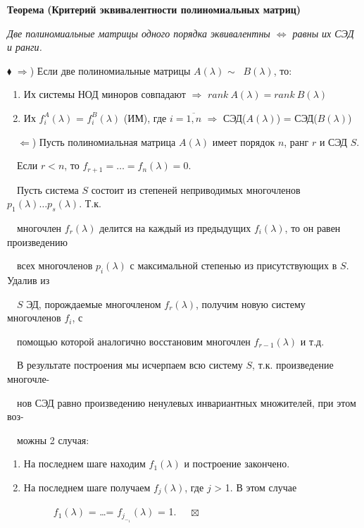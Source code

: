 \documentclass[a4paper, 12pt]{report}
\begin{document}
	\par\bigskip
	\textbf{Теорема}
	\textbf{(Критерий эквивалентности полиномиальных матриц)}
	
	\textit{Две полиномиальные матрицы одного порядка эквивалентны $\Longleftrightarrow$ равны их СЭД и ранги.}
	
	$\blacklozenge$ $\Rightarrow$) Если две полиномиальные матрицы $A(\lambda)$ $\sim$ \ $B(\lambda)$, то:
	
	\begin{enumerate}
		\setlength{\itemindent}{3em}
		\item Их системы НОД миноров совпадают $\Rightarrow$ $rank \ A(\lambda) = rank \ B(\lambda)$ 
		\item Их $f^A_i(\lambda)$ = $f^B_i(\lambda)$ (ИМ), где $i = \overline{1, n}$ $\Rightarrow$ СЭД($A(\lambda)$) = СЭД($B(\lambda)$)
	\end{enumerate}
	
	$\quad \Leftarrow$) Пусть полиномиальная матрица $A(\lambda)$ имеет порядок $n$, ранг $r$ и СЭД $S$.
	\par\bigskip
	$\quad$Если $r < n$, то $f_{r+1} = \dots = f_n(\lambda) = 0$.
	\par\bigskip
	$\quad$Пусть система $S$ состоит из степеней неприводимых многочленов $p_1(\lambda) \dots p_s(\lambda)$. Т.к. 
	
	$\quad$многочлен $f_r(\lambda)$ делится на каждый из предыдущих $f_i(\lambda)$, то он равен произведению
	
	$\quad$всех многочленов $p_i(\lambda)$ с максимальной степенью из присутствующих в $S$. Удалив из 
	
	$\quad$$S$ ЭД, порождаемые многочленом $f_r(\lambda)$, получим новую систему многочленов $f_i$, с 
	
	$\quad$помощью которой аналогично восстановим многочлен $f_{r-1}(\lambda)$ и т.д.
	\par\bigskip
	$\quad$В результате построения мы исчерпаем всю систему $S$, т.к. произведение многочле-
	
	$\quad$нов СЭД равно произведению ненулевых инвариантных множителей, при этом воз-
	
	$\quad$можны 2 случая: 
	\begin{enumerate}
		\setlength{\itemindent}{3em}
		\item На последнем шаге находим $f_1(\lambda)$ и построение закончено.
		\item На последнем шаге получаем $f_j(\lambda)$, где $j$ > 1. В этом случае
		
		$\quad \quad \quad$$f_1(\lambda)$ = \dots = $f_j_-_1(\lambda)$ = 1. $\quad \boxtimes$
	\end{enumerate}
	
\end{document}
